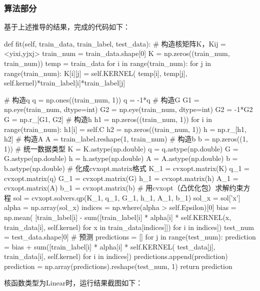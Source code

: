 \documentclass{ctexart}
\begin{document}
\subsubsection{\hei 算法部分}
基于上述推导的结果，完成的代码如下：
\begin{python}
    def fit(self, train_data, train_label, test_data):
    # 构造核矩阵K，Kij = <yixi,yjxj>
    train_num = train_data.shape[0]
    K = np.zeros((train_num, train_num))
    temp = train_data
    for i in range(train_num):
    for j in range(train_num):
    K[i][j] = self.KERNEL(
    temp[i], temp[j], self.kernel)*train_label[i]*train_label[j]

    # 构造q
    q = np.ones((train_num, 1))
    q = -1*q
    # 构造G
    G1 = np.eye(train_num, dtype=int)
    G2 = np.eye(train_num, dtype=int)
    G2 = -1*G2
    G = np.r_[G1, G2]
    # 构造h
    h1 = np.zeros((train_num, 1))
    for i in range(train_num):
    h1[i] = self.C
    h2 = np.zeros((train_num, 1))
    h = np.r_[h1, h2]
    # 构造A
    A = train_label.reshape(1, train_num)
    # 构造b
    b = np.zeros((1, 1))
    # 统一数据类型
    K = K.astype(np.double)
    q = q.astype(np.double)
    G = G.astype(np.double)
    h = h.astype(np.double)
    A = A.astype(np.double)
    b = b.astype(np.double)
    # 化成cvxopt.matrix格式
    K_1 = cvxopt.matrix(K)
    q_1 = cvxopt.matrix(q)
    G_1 = cvxopt.matrix(G)
    h_1 = cvxopt.matrix(h)
    A_1 = cvxopt.matrix(A)
    b_1 = cvxopt.matrix(b)
    # 用cvxopt（凸优化包）求解约束方程
    sol = cvxopt.solvers.qp(K_1, q_1, G_1, h_1, A_1, b_1)
    sol_x = sol['x']
    alpha = np.array(sol_x)
    indices = np.where(alpha > self.Epsilon)[0]
    bias = np.mean(
    [train_label[i] - sum([train_label[i] * alpha[i] * self.KERNEL(x, train_data[i], self.kernel) for x in train_data[indices]]) for i in indices])
    test_num = test_data.shape[0]
    # 预测
    predictions = []
    for j in range(test_num):
    prediction = bias + sum([train_label[i] * alpha[i] * self.KERNEL(
    test_data[j], train_data[i], self.kernel) for i in indices])
    predictions.append(prediction)
    prediction = np.array(predictions).reshape(test_num, 1)
    return prediction
\end{python}
\par 核函数类型为Linear时，运行结果截图如下：
\end{document}
